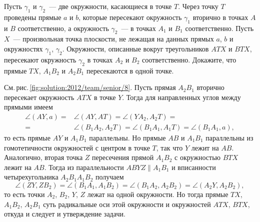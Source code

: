 \problem
{}
Пусть $\gamma_1$ и $\gamma_2$~--- две окружности, касающиеся в точке $T$.
Через точку $T$ проведены прямые $a$ и $b$, которые пересекают окружность $\gamma_1$ вторично в точках $A$ и $B$
соответственно, а окружность $\gamma_2$~--- в точках $A_1$ и $B_1$
соответственно.
Пусть $X$~--- произвольная точка плоскости, не лежащая на данных прямых $a$, $b$ и окружностях $\gamma_1$, $\gamma_2$.
Окружности, описанные вокруг треугольников $ATX$ и $BTX$, пересекают окружность $\gamma_2$ в точках $A_2$ и $B_2$ соответственно.
Докажите, что прямые $TX$, $A_1B_2$ и $A_2B_1$ пересекаются в одной точке.

%
\label{solution:2012/team/senior/8}%
См.\,рис.\,\ref{fig:solution:2012/team/senior/8}.
Пусть прямая $A_2 B_1$ вторично пересекает окружность $ATX$ в точке $Y$.
Тогда для направленных углов между прямыми имеем 
\begin{align*}
    \angle (AY, a)
={}&
    \angle (AY, AT)
=
    \angle (Y A_2, A_2 T)
=\\={}&
    \angle (B_1 A_2, A_2 T)
=
    \angle (B_1 A_1, A_1 T)
=
    \angle (B_1 A_1, a)
,\end{align*}
то есть прямые $AY$ и $A_1 B_1$ параллельны.
Но прямые $AB$ и $A_1 B_1$ параллельны из гомотетичности окружностей с центром
в точке $T$, так что $Y$ лежит на $AB$.
Аналогично, вторая точка $Z$ пересечения прямой $A_1 B_2$ с окружностью $BTX$
лежит на $AB$.
Тогда из параллельности $ABYZ \parallel A_1 B_1$ и вписанности четырехугольника
$A_2 B_1 A_1B_2$ получаем
\[
    \angle (ZY, ZB_2)
=
    \angle (B_1A_1,A_1B_2)
=
    \angle (B_1A_2,A_2B_2)
=
    \angle (A_2Y,A_2B_2)
,\]
то есть точки $A_2$, $B_2$, $Y$, $Z$ лежат на одной окружности.
Но тогда прямые $TX$, $A_1B_2$, $A_2B_1$ суть радикальные оси этой окружности и
окружностей $ATX$, $BTX$, откуда и следует и утверждение задачи.

\endproblem
